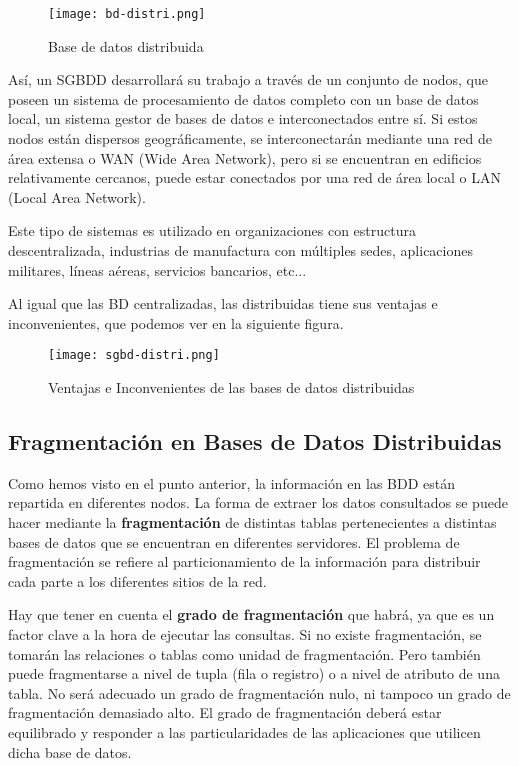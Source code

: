 \begin{figure}[ht]
    \centering
    \texttt{[image: bd-distri.png]}
    \caption{Base de datos distribuida}
\end{figure}

Así, un SGBDD desarrollará su trabajo a través de un conjunto de nodos, que poseen un sistema de procesamiento de datos completo con un base de datos local, un sistema gestor de bases de datos e interconectados entre sí. Si estos nodos están dispersos geográficamente, se interconectarán mediante una red de área extensa o WAN (Wide Area Network), pero si se encuentran en edificios relativamente cercanos, puede estar conectados por una red de área local o LAN (Local Area Network).

Este tipo de sistemas es utilizado en organizaciones con estructura descentralizada, industrias de manufactura con múltiples sedes, aplicaciones militares, líneas aéreas, servicios bancarios, etc...

Al igual que las BD centralizadas, las distribuidas tiene sus ventajas e inconvenientes, que podemos ver en la siguiente figura.

\begin{figure}[ht]
    \centering
    \texttt{[image: sgbd-distri.png]}
    \caption{Ventajas e Inconvenientes de las bases de datos distribuidas}
\end{figure}

\subsection{Fragmentación en Bases de Datos Distribuidas}
Como hemos visto en el punto anterior, la información en las BDD están repartida en diferentes nodos. La forma de extraer los datos consultados se puede hacer mediante la \textbf{fragmentación} de distintas tablas pertenecientes a distintas bases de datos que se encuentran en diferentes servidores. El problema de fragmentación se refiere al particionamiento de la información para distribuir cada parte a los diferentes sitios de la red.

Hay que tener en cuenta el \textbf{grado de fragmentación} que habrá, ya que es un factor clave a la hora de ejecutar las consultas. Si no existe fragmentación, se tomarán las relaciones o tablas como unidad de fragmentación. Pero también puede fragmentarse a nivel de tupla (fila o registro) o a nivel de atributo de una tabla. No será adecuado un grado de fragmentación nulo, ni tampoco un grado de fragmentación demasiado alto. El grado de fragmentación deberá estar equilibrado y responder a las particularidades de las aplicaciones que utilicen dicha base de datos.

